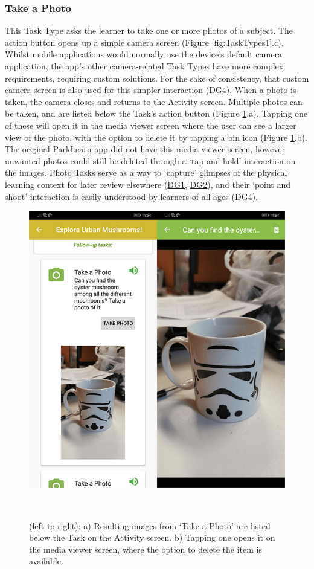 \subsubsection*{Take a Photo}
This Task Type asks the learner to take one or more photos of a subject. The action button opens up a simple camera screen (Figure \ref{fig:TaskTypes1}.c). Whilst mobile applications would normally use the device's default camera application, the app's other camera-related Task Types have more complex requirements, requiring custom solutions. For the sake of consistency, that custom camera screen is also used for this simpler interaction (\hyperref[DG4]{DG4}). When a photo is taken, the camera closes and returns to the Activity screen. Multiple photos can be taken, and are listed below the Task's action button (Figure \ref{fig:MediaViewer}.a). Tapping one of these will open it in the media viewer screen where the user can see a larger view of the photo, with the option to delete it by tapping a bin icon (Figure \ref{fig:MediaViewer}.b). The original ParkLearn app did not have this media viewer screen, however unwanted photos could still be deleted through a `tap and hold' interaction on the images. Photo Tasks serve as a way to `capture' glimpses of the physical learning context for later review elsewhere (\hyperref[DG1]{DG1}, \hyperref[DG2]{DG2}), and their `point and shoot' interaction is easily understood by learners of all ages (\hyperref[DG4]{DG4}).

\begin{figure}
  \centering
  \includegraphics[width=0.55\columnwidth]{images/chapter05/mediaViewer.png}
  \caption[OurPlace's media viewer]{(left to right): a) Resulting images from `Take a Photo' are listed below the Task on the Activity screen. b) Tapping one opens it on the media viewer screen, where the option to delete the item is available.}~\label{fig:MediaViewer}
\end{figure}

